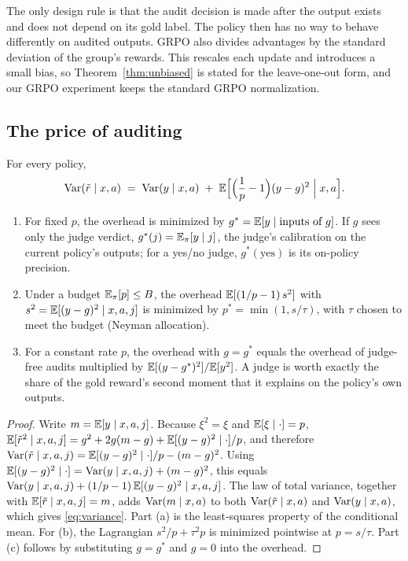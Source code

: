 The only design rule is that the audit decision is made after the output exists and does not depend on its gold label. The policy then has no way to behave differently on audited outputs. GRPO \citep{shao2024deepseekmath} also divides advantages by the standard deviation of the group's rewards. This rescales each update and introduces a small bias, so Theorem~\ref{thm:unbiased} is stated for the leave-one-out form, and our GRPO experiment keeps the standard GRPO normalization.

\subsection{The price of auditing}

\begin{theorem}
\label{thm:variance}
For every policy,
\begin{equation}
\mathrm{Var}(\tilde r\mid x,a)\;=\;\mathrm{Var}(y\mid x,a)\;+\;\mathbb{E}\Bigl[\Bigl(\frac1p-1\Bigr)(y-g)^2\Bigm| x,a\Bigr].
\label{eq:variance}
\end{equation}
\begin{enumerate}
\item[(a)] For fixed $p$, the overhead is minimized by $g^*=\mathbb{E}[y\mid \text{inputs of }g]$. If $g$ sees only the judge verdict, $g^*(j)=\mathbb{E}_{\pi}[y\mid j]$, the judge's calibration on the current policy's outputs; for a yes/no judge, $g^*(\text{yes})$ is its on-policy precision.
\item[(b)] Under a budget $\mathbb{E}_\pi[p]\le B$, the overhead $\mathbb{E}[(1/p-1)\,s^2]$ with $s^2=\mathbb{E}[(y-g)^2\mid x,a,j]$ is minimized by $p^*=\min(1,s/\tau)$, with $\tau$ chosen to meet the budget (Neyman allocation).
\item[(c)] For a constant rate $p$, the overhead with $g=g^*$ equals the overhead of judge-free audits multiplied by $\mathbb{E}[(y-g^*)^2]/\mathbb{E}[y^2]$. A judge is worth exactly the share of the gold reward's second moment that it explains on the policy's own outputs.
\end{enumerate}
\end{theorem}

\begin{proof}
Write $m=\mathbb{E}[y\mid x,a,j]$. Because $\xi^2=\xi$ and $\mathbb{E}[\xi\mid\cdot]=p$, $\mathbb{E}[\tilde r^2\mid x,a,j]=g^2+2g(m-g)+\mathbb{E}[(y-g)^2\mid\cdot]/p$, and therefore $\mathrm{Var}(\tilde r\mid x,a,j)=\mathbb{E}[(y-g)^2\mid\cdot]/p-(m-g)^2$. Using $\mathbb{E}[(y-g)^2\mid\cdot]=\mathrm{Var}(y\mid x,a,j)+(m-g)^2$, this equals $\mathrm{Var}(y\mid x,a,j)+(1/p-1)\,\mathbb{E}[(y-g)^2\mid x,a,j]$. The law of total variance, together with $\mathbb{E}[\tilde r\mid x,a,j]=m$, adds $\mathrm{Var}(m\mid x,a)$ to both $\mathrm{Var}(\tilde r\mid x,a)$ and $\mathrm{Var}(y\mid x,a)$, which gives \eqref{eq:variance}. Part (a) is the least-squares property of the conditional mean. For (b), the Lagrangian $s^2/p+\tau^2p$ is minimized pointwise at $p=s/\tau$. Part (c) follows by substituting $g=g^*$ and $g=0$ into the overhead.
\end{proof}

